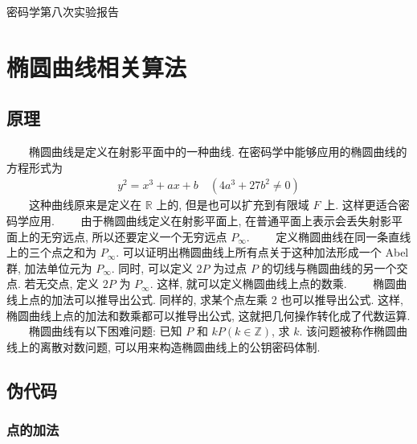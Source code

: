 \documentclass[12pt,a4paper]{article}
\begin{document}
{

\begin{center}
密码学第八次实验报告
\end{center}
}

\section*{椭圆曲线相关算法}

\subsection*{原理}

　　椭圆曲线是定义在射影平面中的一种曲线. 在密码学中能够应用的椭圆曲线的方程形式为
\begin{align*}
y^2 = x^3 + ax + b \quad (4 a^3 + 27 b^2 \neq 0)
\end{align*}
\noindent
　　这种曲线原来是定义在 $ \mathbb{R} $ 上的, 但是也可以扩充到有限域 $ F $ 上. 这样更适合密码学应用. 
\newline
　　由于椭圆曲线定义在射影平面上, 在普通平面上表示会丢失射影平面上的无穷远点, 所以还要定义一个无穷远点 $ P_{\infty} $. 
\newline
　　定义椭圆曲线在同一条直线上的三个点之和为 $ P_{\infty} $. 可以证明出椭圆曲线上所有点关于这种加法形成一个 Abel 群, 加法单位元为 $ P_{\infty} $. 同时, 可以定义 $ 2P $ 为过点 $ P $ 的切线与椭圆曲线的另一个交点. 若无交点, 定义 $ 2P $ 为 $ P_{\infty} $. 这样, 就可以定义椭圆曲线上点的数乘. 
\newline
　　椭圆曲线上点的加法可以推导出公式. 同样的, 求某个点左乘 $ 2 $ 也可以推导出公式. 这样, 椭圆曲线上点的加法和数乘都可以推导出公式, 这就把几何操作转化成了代数运算. 
\newline
　　椭圆曲线有以下困难问题: 已知 $ P $ 和 $ kP (k \in \mathbb{Z} ) $, 求 $ k $. 该问题被称作椭圆曲线上的离散对数问题, 可以用来构造椭圆曲线上的公钥密码体制.

\subsection*{伪代码}

\subsubsection*{点的加法}
\end{document}

